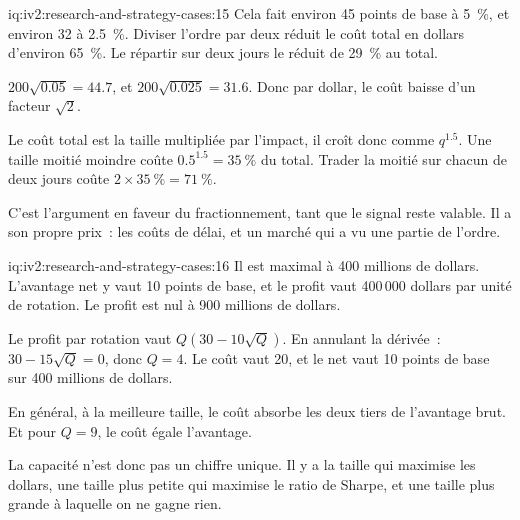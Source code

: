 \begin{solution}{iq:iv2:research-and-strategy-cases:15}
Cela fait environ 45 points de base à 5~\%, et environ 32 à 2.5~\%. Diviser l'ordre par deux réduit le coût total en dollars d'environ 65~\%. Le répartir sur deux jours le réduit de 29~\% au total.

$200\sqrt{0.05} = 44.7$, et $200\sqrt{0.025} = 31.6$. Donc par dollar, le coût baisse d'un facteur $\sqrt{2}$.

Le coût total est la taille multipliée par l'impact, il croît donc comme $q^{1.5}$. Une taille moitié moindre coûte $0.5^{1.5} = 35~\%$ du total. Trader la moitié sur chacun de deux jours coûte $2 \times 35~\% = 71~\%$.

C'est l'argument en faveur du fractionnement, tant que le signal reste valable. Il a son propre prix~: les coûts de délai, et un marché qui a vu une partie de l'ordre.

\end{solution}

\begin{solution}{iq:iv2:research-and-strategy-cases:16}
Il est maximal à 400 millions de dollars. L'avantage net y vaut 10 points de base, et le profit vaut 400\,000 dollars par unité de rotation. Le profit est nul à 900 millions de dollars.

Le profit par rotation vaut $Q(30 - 10\sqrt{Q})$. En annulant la dérivée~: $30 - 15\sqrt{Q} = 0$, donc $Q = 4$. Le coût vaut 20, et le net vaut 10 points de base sur 400 millions de dollars.

En général, à la meilleure taille, le coût absorbe les deux tiers de l'avantage brut. Et pour $Q = 9$, le coût égale l'avantage.

La capacité n'est donc pas un chiffre unique. Il y a la taille qui maximise les dollars, une taille plus petite qui maximise le ratio de Sharpe, et une taille plus grande à laquelle on ne gagne rien.

\end{solution}

